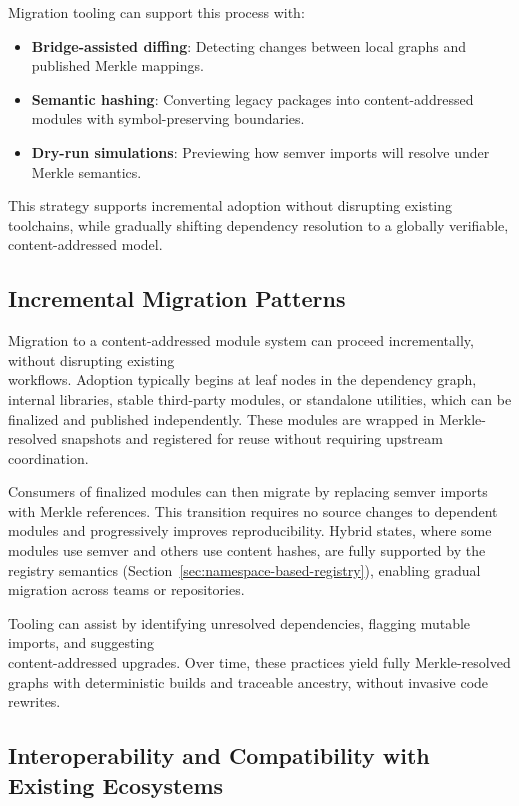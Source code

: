 \documentclass[sigplan,screen]{acmart}
\begin{document}
Migration tooling can support this process with: 
\begin{itemize} 
  \item \textbf{Bridge-assisted diffing}: Detecting changes between local graphs and published Merkle mappings. 
  \item \textbf{Semantic hashing}: Converting legacy packages into content-addressed modules with symbol-pre\-serving boundaries. 
  \item \textbf{Dry-run simulations}: Previewing how semver imports will resolve under Merkle semantics. 
\end{itemize}

This strategy supports incremental adoption without disrupting existing toolchains, while gradually shifting dependency resolution to a globally verifiable, content-addressed model.

\subsection{Incremental Migration Patterns}
\label{sec:incremental-migration}

Migration to a content-addressed module system can proceed incrementally, without disrupting existing \\workflows. Adoption typically begins at leaf nodes in the dependency graph, internal libraries, stable third-party modules, or standalone utilities, which can be finalized and published independently. These modules are wrapped in Merkle-resolved snapshots and registered for reuse without requiring upstream coordination.

Consumers of finalized modules can then migrate by replacing semver imports with Merkle references. This transition requires no source changes to dependent modules and progressively improves reproducibility. Hybrid states, where some modules use semver and others use content hashes, are fully supported by the registry semantics (Section~\ref{sec:namespace-based-registry}), enabling gradual migration across teams or repositories.

Tooling can assist by identifying unresolved dependencies, flagging mutable imports, and suggesting \\content-addressed upgrades. Over time, these practices yield fully Merkle-resolved graphs with deterministic builds and traceable ancestry, without invasive code rewrites.

\subsection{Interoperability and Compatibility with Existing Ecosystems}
\label{sec:interoperability-existing}
\end{document}
